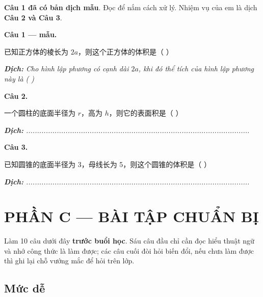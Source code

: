\documentclass[11pt, a4paper]{article}
\begin{document}
\textbf{Câu 1 đã có bản dịch mẫu}. Đọc để nắm cách xử lý. Nhiệm vụ của em là dịch \textbf{Câu 2 và Câu 3}.

\textbf{Câu 1 — mẫu.}

已知正方体的棱长为 $2a$，则这个正方体的体积是（ ）

\noindent\emph{\textbf{Dịch:} Cho hình lập phương có cạnh dài $2a$, khi đó thể tích của hình lập phương này là ( )}

\textbf{Câu 2.}

一个圆柱的底面半径为 $r$，高为 $h$，则它的表面积是（ ）

\noindent\emph{\textbf{Dịch:} ......................................................................................................}

\textbf{Câu 3.}

已知圆锥的底面半径为 3，母线长为 5，则这个圆锥的体积是（ ）

\noindent\emph{\textbf{Dịch:} ......................................................................................................}

\section{PHẦN C — BÀI TẬP CHUẨN BỊ}

Làm 10 câu dưới đây \textbf{trước buổi học}. Sáu câu đầu chỉ cần đọc hiểu thuật ngữ và nhớ công thức là làm được; các câu cuối đòi hỏi biến đổi, nếu chưa làm được thì ghi lại chỗ vướng mắc để hỏi trên lớp.

\subsection{Mức dễ}
\end{document}
